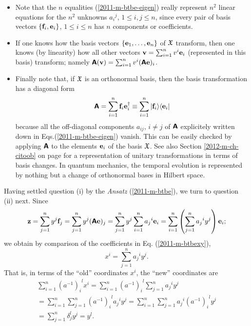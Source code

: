 \begin{itemize}
\item
Note   that the $n$ equalities (\ref {2011-m-btbe-eigen})
really represent $n^2$ linear equations for the $n^2$
unknowns ${a_i}^j$, $1\le i,j\le n$, since every pair of basis vectors
$\{{\bf f}_i,{\bf e}_i\}$, $1\le i\le n$ has $n$ components or coefficients.

\item
If one knows how the basis vectors
$
\{
{\bf e}_1,
\ldots ,
{\bf e}_n
\}$ of ${\frak X}$    transform, then one knows (by linearity) how
all other vectors
${\bf v}=
\sum_{i=1}^n v^i{\bf e}_i
$
(represented in this basis) transform; namely
$\textsf{\textbf{A}}({\bf v})=
\sum_{i=1}^n v^i (\textsf{\textbf{A}}{\bf e})_i
$.

\item
Finally note that, if  ${\frak X}$ is an orthonormal basis,
then the basis transformation has a diagonal form
\begin{equation}
\textsf{\textbf{A}} =   \sum_{i=1}^n  {\bf f}_i {\bf e}_i^\dagger
\equiv
\sum_{i=1}^n \vert {\bf f}_i \rangle \langle {\bf e}_i \vert
\label{2013-m-ch-fdvs-dftm}
\end{equation}
because all the off-diagonal components $a_{ij}$, $i\neq j$ of $\textsf{\textbf{A}}$
explicitely written down in Eqs.(\ref{2011-m-btbe-eigen}) vanish.
This can be easily checked by applying $\textsf{\textbf{A}}$ to the elements ${\bf e}_i $ of the basis ${\frak X}$.
See also Section
\ref{2012-m-ch-citoob} on page \pageref{2012-m-ch-citoob}
for a representation of unitary transformations in terms of basis changes.
In quantum mechanics, the temporal evolution is represented by nothing but a change of orthonormal bases in Hilbert space.
\end{itemize}

Having settled question (i) by the {\it Ansatz}
(\ref{2011-m-btbe}),
we turn to question (ii) next.
Since
\begin{equation}
{\bf z} =
 \sum_{j=1}^n y^j {\bf f}_j=
 \sum_{j=1}^n  y^j (\textsf{\textbf{A}}{\bf e})_j=
 \sum_{j=1}^n  y^j  \sum_{i=1}^n {a_j}^i {\bf e}_i=
  \sum_{i=1}^n \left(\sum_{j=1}^n  {a_j}^i y^j \right)   {\bf e}_i;
\end{equation}
we obtain by comparison of the coefficients in Eq. (\ref{2011-m-btbexy}),
\begin{equation}
x^i= \sum_{j=1}^n {a_j}^i y^j.
\label{2012-m-ch-e-tl1}
\end{equation}
That is, in terms of the ``old'' coordinates $x^i$,
the ``new'' coordinates are
\begin{equation}
\begin{split}
\sum_{i=1}^n {(a^{-1})_i}^l x^i= \sum_{i=1}^n {(a^{-1})_i}^l  \sum_{j=1}^n  {a_j}^i y^j \\
=  \sum_{i=1}^n \sum_{j=1}^n {(a^{-1})_i}^l  {a_j}^i y^j
=  \sum_{i=1}^n \sum_{j=1}^n {a_j}^i {(a^{-1})_i}^l  y^j  \\
=   \sum_{j=1}^n \delta^l_j y^j
=  y^{l}
.
\label{2012-m-ch-e-tl2}
\end{split}
\end{equation}

